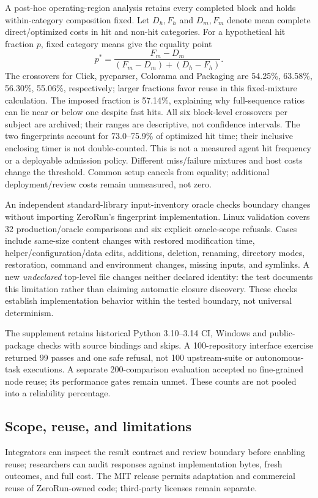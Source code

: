 \documentclass[preprint,12pt,a4paper]{elsarticle}
\begin{document}
A post-hoc operating-region analysis retains every completed block and holds within-category composition fixed. Let $D_h,F_h$ and $D_m,F_m$ denote mean complete direct/optimized costs in hit and non-hit categories. For a hypothetical hit fraction $p$, fixed category means give the equality point
\[p^*=\frac{F_m-D_m}{(F_m-D_m)+(D_h-F_h)}.\]
The crossovers for Click, pycparser, Colorama and Packaging are 54.25\%, 63.58\%, 56.30\%, 55.06\%, respectively; larger fractions favor reuse in this fixed-mixture calculation. The imposed fraction is 57.14\%, explaining why full-sequence ratios can lie near or below one despite fast hits. All six block-level crossovers per subject are archived; their ranges are descriptive, not confidence intervals. The two fingerprints account for 73.0--75.9\% of optimized hit time; their inclusive enclosing timer is not double-counted. This is not a measured agent hit frequency or a deployable admission policy. Different miss/failure mixtures and host costs change the threshold. Common setup cancels from equality; additional deployment/review costs remain unmeasured, not zero.

An independent standard-library input-inventory oracle checks boundary changes without importing ZeroRun's fingerprint implementation. Linux validation covers 32 production/oracle comparisons and six explicit oracle-scope refusals. Cases include same-size content changes with restored modification time, helper/configuration/data edits, additions, deletion, renaming, directory modes, restoration, command and environment changes, missing inputs, and symlinks. A new \emph{undeclared} top-level file changes neither declared identity: the test documents this limitation rather than claiming automatic closure discovery. These checks establish implementation behavior within the tested boundary, not universal determinism.

The supplement retains historical Python 3.10--3.14 CI, Windows and public-package checks with source bindings and skips. A 100-repository interface exercise returned 99 passes and one safe refusal, not 100 upstream-suite or autonomous-task executions. A separate 200-comparison evaluation accepted no fine-grained node reuse; its performance gates remain unmet. These counts are not pooled into a reliability percentage.

\subsection{Scope, reuse, and limitations}
Integrators can inspect the result contract and review boundary before enabling reuse; researchers can audit responses against implementation bytes, fresh outcomes, and full cost. The MIT release permits adaptation and commercial reuse of ZeroRun-owned code; third-party licenses remain separate.
\end{document}
